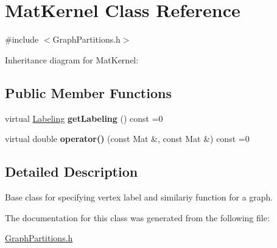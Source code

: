 \hypertarget{class_mat_kernel}{\section{Mat\-Kernel Class Reference}
\label{class_mat_kernel}
}


{\ttfamily \#include $<$Graph\-Partitions.\-h$>$}



Inheritance diagram for Mat\-Kernel\-:
\subsection*{Public Member Functions}
\begin{DoxyCompactItemize}
\item 
\hypertarget{class_mat_kernel_ade4bb4f5871e0510771f9761d2715c33}{virtual \hyperlink{_graph_partitions_8h_aec5dc4d7252a04b7888874cd64e02e78}{Labeling} {\bfseries get\-Labeling} () const =0}\label{class_mat_kernel_ade4bb4f5871e0510771f9761d2715c33}

\item 
\hypertarget{class_mat_kernel_ae87b7f63f532c609c6c3e8d3a7144888}{virtual double {\bfseries operator()} (const Mat \&, const Mat \&) const =0}\label{class_mat_kernel_ae87b7f63f532c609c6c3e8d3a7144888}

\end{DoxyCompactItemize}


\subsection{Detailed Description}
Base class for specifying vertex label and similariy function for a graph. 

The documentation for this class was generated from the following file\-:\begin{DoxyCompactItemize}
\item 
\hyperlink{_graph_partitions_8h}{Graph\-Partitions.\-h}\end{DoxyCompactItemize}
